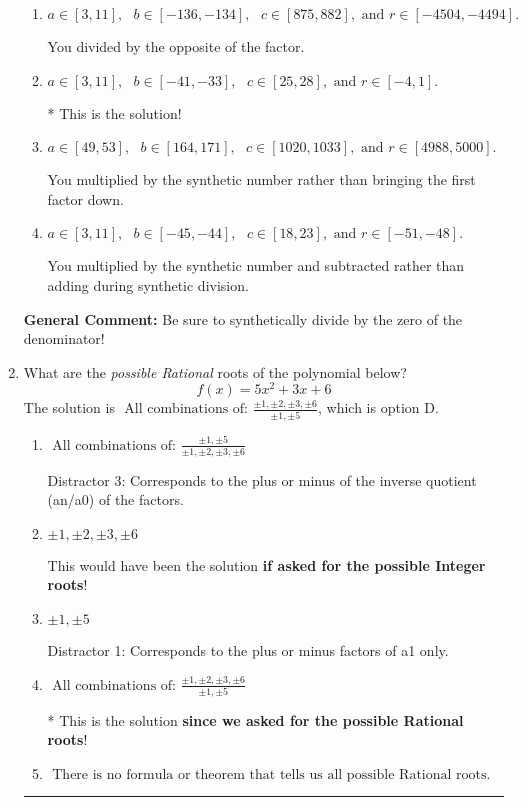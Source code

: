 \documentclass{extbook}[14pt]
\newcommand{\litem}[1]{\item #1

\rule{\textwidth}{0.4pt}}
\begin{document}
\begin{enumerate}
{\begin{enumerate}[label=\Alph*.]
 You divided by the opposite of the factor AND multiplied the first factor rather than just bringing it down.
\item \( a \in [3, 11], \text{   } b \in [-136, -134], \text{   } c \in [875, 882], \text{   and   } r \in [-4504, -4494]. \)

 You divided by the opposite of the factor.
\item \( a \in [3, 11], \text{   } b \in [-41, -33], \text{   } c \in [25, 28], \text{   and   } r \in [-4, 1]. \)

* This is the solution!
\item \( a \in [49, 53], \text{   } b \in [164, 171], \text{   } c \in [1020, 1033], \text{   and   } r \in [4988, 5000]. \)

 You multiplied by the synthetic number rather than bringing the first factor down.
\item \( a \in [3, 11], \text{   } b \in [-45, -44], \text{   } c \in [18, 23], \text{   and   } r \in [-51, -48]. \)

 You multiplied by the synthetic number and subtracted rather than adding during synthetic division.
\end{enumerate}

\textbf{General Comment:} Be sure to synthetically divide by the zero of the denominator!
}
\litem{
What are the \textit{possible Rational} roots of the polynomial below?
\[ f(x) = 5x^{2} +3 x + 6 \]The solution is \( \text{ All combinations of: }\frac{\pm 1,\pm 2,\pm 3,\pm 6}{\pm 1,\pm 5} \), which is option D.\begin{enumerate}[label=\Alph*.]
\item \( \text{ All combinations of: }\frac{\pm 1,\pm 5}{\pm 1,\pm 2,\pm 3,\pm 6} \)

 Distractor 3: Corresponds to the plus or minus of the inverse quotient (an/a0) of the factors. 
\item \( \pm 1,\pm 2,\pm 3,\pm 6 \)

This would have been the solution \textbf{if asked for the possible Integer roots}!
\item \( \pm 1,\pm 5 \)

 Distractor 1: Corresponds to the plus or minus factors of a1 only.
\item \( \text{ All combinations of: }\frac{\pm 1,\pm 2,\pm 3,\pm 6}{\pm 1,\pm 5} \)

* This is the solution \textbf{since we asked for the possible Rational roots}!
\item \( \text{ There is no formula or theorem that tells us all possible Rational roots.} \)


\end{enumerate}}
\end{enumerate}
\end{document}
